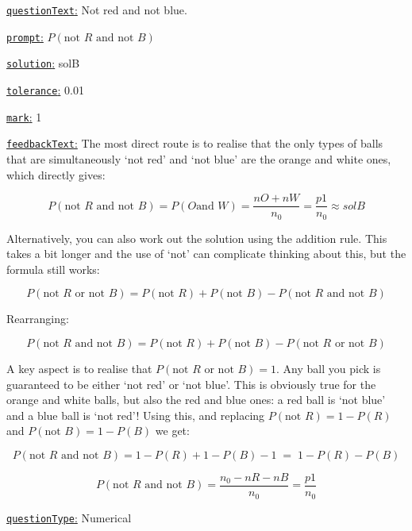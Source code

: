 \documentclass[preview]{standalone}
\newcommand \fieldname[1]{\underline{\texttt{#1}:}}
\begin{document}
\fieldname{questionText}
Not red and not blue.

\fieldname{prompt}
$P(\textrm{not } R \textrm{ and not } B)$

\fieldname{solution}
solB

\fieldname{tolerance}
0.01

\fieldname{mark}
1

\fieldname{feedbackText}
The most direct route is to realise that the only types of balls that are simultaneously `not red' and `not blue' are the orange and white ones, which directly gives:

\[
P(\textrm{not } R \textrm{ and not } B) =  P( O \textrm{and } W) = \frac{{nO}+{nW}}{{n_0}} = \frac{{p1}}{{n_0}} \approx {solB}
\]

Alternatively, you can also work out the solution using the addition rule. This takes a bit longer and the use of `not' can complicate thinking about this, but the formula still works:

\[
P(\textrm{not } R \textrm{ or not } B) = P(\textrm{not } R) + P(\textrm{not } B) - P(\textrm{not } R \textrm{ and not } B)
\]

Rearranging:

\[
P(\textrm{not } R \textrm{ and not } B) = P(\textrm{not } R) + P(\textrm{not } B) - P(\textrm{not } R \textrm{ or not } B)
\]

A key aspect is to realise that $P(\textrm{not } R \textrm{ or not } B) = 1$. Any ball you pick is guaranteed to be either `not red' or `not blue'. This is obviously true for the orange and white balls, but also the red and blue ones: a red ball is `not blue' and a blue ball is `not red'! Using this, and replacing $P(\textrm{not } R) = 1 - P(R)$ and $P(\textrm{not } B) = 1 - P(B)$ we get:

\[
P(\textrm{not } R \textrm{ and not } B) = 1 - P(R) + 1 - P(B) - 1 \; = \; 1 - P(R) - P(B)
\]

\[
P(\textrm{not } R \textrm{ and not } B) = \frac{{n_0} - {nR} - {nB}}{{n_0}} = \frac{{p1}}{{n_0}}
\]


\fieldname{questionType}
Numerical
\end{document}
